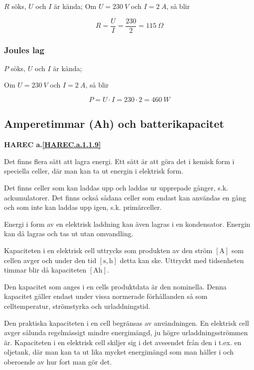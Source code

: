 \(R\) söks, \(U\) och \(I\) är kända;
Om \(U = 230\ V\) och \(I = 2\ A\), så blir

\begin{equation*}
  R=\dfrac{U}{I}=\dfrac{230}{2}=115\ \Omega
\end{equation*}

\subsubsection{Joules lag}

\(P\) söks, \(U\) och \(I\) är kända;

Om \(U = 230\ V\) och \(I = 2\ A\), så blir

\begin{equation*}
  P = U \cdot I = 230 \cdot 2 = 460\ W
\end{equation*}

\subsection{Amperetimmar (Ah) och batterikapacitet}
\textbf{HAREC a.\ref{HAREC.a.1.1.9}\label{myHAREC.a.1.1.9}}

Det finns flera sätt att lagra energi.
Ett sätt är att göra det i kemisk form i speciella celler, där man kan ta ut
energin i elektrisk form.

Det finns celler som kan laddas upp och laddas ur upprepade gånger, s.k.
ackumulatorer.
Det finns också sådana celler som endast kan användas en gång och som inte
kan laddas upp igen, s.k. primärceller.

Energi i form av en elektrisk laddning kan även lagras i en kondensator.
Energin kan då lagras och tas ut utan omvandling.

Kapaciteten i en elektrisk cell uttrycks som produkten av den ström
\(\mathrm{[A]}\) som cellen avger och under den tid \(\mathrm{[s, h]}\) detta
kan ske.
Uttryckt med tidsenheten timmar blir då kapaciteten \(\mathrm{[Ah]}\).

Den kapacitet som anges i en cells produktdata är den nominella.
Denna kapacitet gäller endast under vissa normerade förhållanden så som
celltemperatur, strömstyrka och urladdningstid.

Den praktiska kapaciteten i en cell begränsas av användningen.
En elektrisk cell avger sålunda regelmässigt mindre energimängd, ju högre
urladdningsströmmen är.
Kapaciteten i en elektrisk cell skiljer sig i det avseendet från den i
t.ex. en oljetank, där man kan ta ut lika mycket energimängd som man häller i
och oberoende av hur fort man gör det.

